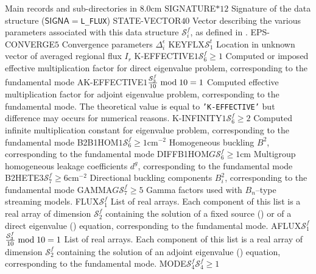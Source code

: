 \begin{DescriptionEnregistrement}{Main records and sub-directories in }{8.0cm}
\CharEnr
  {SIGNATURE}{$*12$}
  {Signature of the data structure ($\mathsf{SIGNA}=${\tt L\_FLUX})}
\IntEnr
  {STATE-VECTOR}{$40$}
  {Vector describing the various parameters associated with this data structure $\mathcal{S}^{f}_{i}$,
  as defined in .}
\RealEnr
  {EPS-CONVERGE}{$5$}{}
  {Convergence parameters $\Delta_i^\epsilon$}
\IntEnr
  {KEYFLX}{$\mathcal{S}^{t}_{1}$}
  {Location in unknown vector of averaged regional flux $I_{r}$}
\OptRealEnr
  {K-EFFECTIVE}{$1$}{$\mathcal{S}^{f}_{6}\ge 1$}{}
  {Computed or imposed effective multiplication factor for direct eigenvalue problem,
  corresponding to the fundamental mode}
\OptRealEnr
  {AK-EFFECTIVE}{$1$}{${\mathcal{S}^{f}_{3}\over 10} \bmod 10 = 1$}{}
  {Computed effective multiplication factor for adjoint eigenvalue problem,
  corresponding to the fundamental mode.
  The theoretical value is equal
  to {\tt 'K-EFFECTIVE'} but difference may occurs for numerical reasons.}
\OptRealEnr
  {K-INFINITY}{$1$}{$\mathcal{S}^{f}_{6}\ge 2$}{}
  {Computed infinite multiplication constant for eigenvalue problem,
  corresponding to the fundamental mode}
\OptRealEnr
  {B2B1HOM}{$1$}{$\mathcal{S}^{f}_{6}\ge 1$}{cm$^{-2}$}
  {Homogeneous buckling $B^{2}$,
  corresponding to the fundamental mode}
\OptRealEnr
  {DIFFB1HOM}{$G$}{$\mathcal{S}^{f}_{6}\ge 1$}{cm}
  {Multigroup homogeneous leakage coefficients $d^{g}$,
  corresponding to the fundamental mode}
\OptRealEnr
  {B2HETE}{$3$}{$\mathcal{S}^{f}_{7} \ge 6$}{cm$^{-2}$}
  {Directional buckling components $B^{2}_{i}$,
  corresponding to the fundamental mode}
\OptRealEnr
  {GAMMA}{$G$}{$\mathcal{S}^{f}_{7}\ge 5$}{}
  {Gamma factors used with $B_n$--type streaming models.}
\DirlEnr
  {FLUX}{$\mathcal{S}^{f}_{1}$}
  {List of real arrays. Each component of this list is a real array of dimension $\mathcal{S}^{f}_{2}$
  containing the solution of a fixed source () or of a direct eigenvalue () equation,
  corresponding to the fundamental mode.}
\OptDirlEnr
  {AFLUX}{$\mathcal{S}^{f}_{1}$}{${\mathcal{S}^{f}_{3}\over 10} \bmod 10 = 1$}
  {List of real arrays. Each component of this list is a real array of dimension $\mathcal{S}^{f}_{2}$
  containing the solution of an adjoint eigenvalue () equation,
  corresponding to the fundamental mode.}
\OptDirlEnr
  {MODE}{$\mathcal{S}^{f}_{4}$}{$\mathcal{S}^{f}_{4}\ge 1$}

\end{DescriptionEnregistrement}
